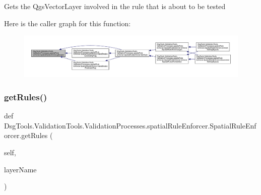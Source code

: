\begin{DoxyVerb}Gets the QgsVectorLayer involved in the rule that is about to be tested
\end{DoxyVerb}
 Here is the caller graph for this function\+:
\nopagebreak
\begin{figure}[H]
\begin{center}
\leavevmode
\includegraphics[width=350pt]{class_dsg_tools_1_1_validation_tools_1_1_validation_processes_1_1spatial_rule_enforcer_1_1_spatial_rule_enforcer_afa2ba2a249fc1aa3b5418f6490438b2d_icgraph}
\end{center}
\end{figure}
\mbox{\label{class_dsg_tools_1_1_validation_tools_1_1_validation_processes_1_1spatial_rule_enforcer_1_1_spatial_rule_enforcer_a5154552ccfe6d67c64a9198c705f3581}} 
\subsubsection{\texorpdfstring{get\+Rules()}{getRules()}}
{\footnotesize\ttfamily def Dsg\+Tools.\+Validation\+Tools.\+Validation\+Processes.\+spatial\+Rule\+Enforcer.\+Spatial\+Rule\+Enforcer.\+get\+Rules (\begin{DoxyParamCaption}\item[{}]{self,  }\item[{}]{layer\+Name }\end{DoxyParamCaption})}

